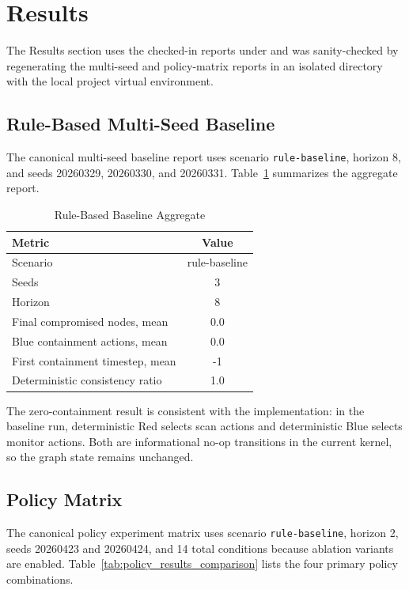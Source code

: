 \documentclass[conference]{IEEEtran}
\begin{document}
\section{Results}
The Results section uses the checked-in reports under  and was sanity-checked by regenerating the multi-seed and policy-matrix reports in an isolated  directory with the local project virtual environment.

\subsection{Rule-Based Multi-Seed Baseline}
The canonical multi-seed baseline report uses scenario \texttt{rule-baseline}, horizon 8, and seeds 20260329, 20260330, and 20260331. Table~\ref{tab:baseline_results} summarizes the aggregate report.

\begin{table}[H]
\centering
\caption{Rule-Based Baseline Aggregate}
\label{tab:baseline_results}
\begin{tabular}{|l|c|}
\hline
\textbf{Metric} & \textbf{Value} \\
\hline
Scenario & rule-baseline \\
\hline
Seeds & 3 \\
\hline
Horizon & 8 \\
\hline
Final compromised nodes, mean & 0.0 \\
\hline
Blue containment actions, mean & 0.0 \\
\hline
First containment timestep, mean & -1 \\
\hline
Deterministic consistency ratio & 1.0 \\
\hline
\end{tabular}
\end{table}

The zero-containment result is consistent with the implementation: in the baseline run, deterministic Red selects scan actions and deterministic Blue selects monitor actions. Both are informational no-op transitions in the current kernel, so the graph state remains unchanged.

\subsection{Policy Matrix}
The canonical policy experiment matrix uses scenario \texttt{rule-baseline}, horizon 2, seeds 20260423 and 20260424, and 14 total conditions because ablation variants are enabled. Table~\ref{tab:policy_results_comparison} lists the four primary policy combinations.
\end{document}
